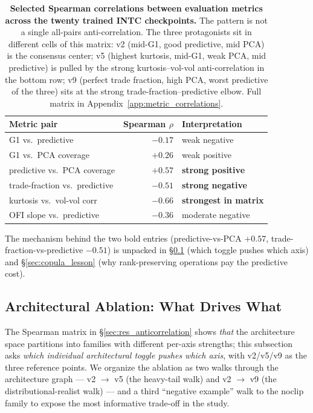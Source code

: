 \documentclass[journal]{IEEEtran}
\theoremstyle{definition}   %
\begin{document}
\begin{table}[ht]
    \centering
    \footnotesize
    \begin{tabular}{lrl}
        \toprule
        Metric pair & Spearman $\rho$ & Interpretation \\
        \midrule
        G1 vs.\ predictive          & $-0.17$ & weak negative \\
        G1 vs.\ PCA coverage        & $+0.26$ & weak positive \\
        predictive vs.\ PCA coverage& $+0.57$ & \textbf{strong positive} \\
        trade-fraction vs.\ predictive  & $-0.51$ & \textbf{strong negative} \\
        kurtosis vs.\ vol-vol corr      & $-0.66$ & \textbf{strongest in matrix} \\
        OFI slope vs.\ predictive       & $-0.36$ & moderate negative \\
        \bottomrule
    \end{tabular}
    \caption{\textbf{Selected Spearman correlations between evaluation
    metrics across the twenty trained INTC checkpoints.} The pattern is
    not a single all-pairs anti-correlation. The three protagonists sit
    in different cells of this matrix: v2 (mid-G1, good predictive,
    mid PCA) is the consensus center; v5 (highest kurtosis, mid-G1,
    weak PCA, mid predictive) is pulled by the strong kurtosis--vol-vol
    anti-correlation in the bottom row; v9 (perfect trade fraction,
    high PCA, worst predictive of the three) sits at the strong
    trade-fraction--predictive elbow. Full matrix in
    Appendix~\ref{app:metric_correlations}.}
    \label{tab:correlation_subset}
\end{table}

The mechanism behind the two bold entries
(predictive-vs-PCA $+0.57$, trade-fraction-vs-predictive $-0.51$)
is unpacked in \S\ref{sec:res_ablation} (which toggle pushes which
axis) and \S\ref{sec:copula_lesson} (why rank-preserving
operations pay the predictive cost).

\subsection{Architectural Ablation: What Drives What}
\label{sec:res_ablation}

The Spearman matrix in \S\ref{sec:res_anticorrelation} shows
\emph{that} the architecture space partitions into families with
different per-axis strengths; this subsection asks \emph{which
individual architectural toggle pushes which axis}, with v2/v5/v9 as
the three reference points. We organize the ablation as two walks
through the architecture graph --- v2 $\to$ v5 (the heavy-tail walk)
and v2 $\to$ v9 (the distributional-realist walk) --- and a third
``negative example'' walk to the noclip family to expose the most
informative trade-off in the study.
\end{document}
